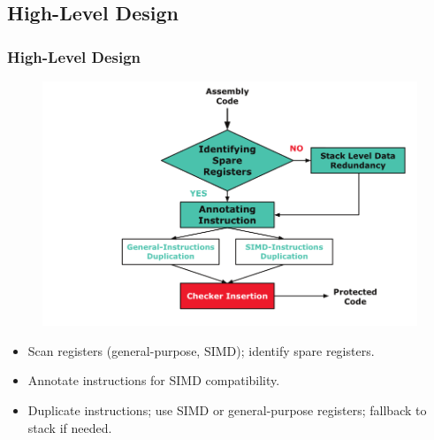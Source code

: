 \documentclass[
	12pt, %
]{beamer}
\begin{document}
\subsection{High-Level Design}
\begin{frame}
	\frametitle{High-Level Design}
	
	\begin{figure}
		\centering
		\includegraphics[width=0.7\linewidth]{Images/img10}
		\label{fig:img10}
	\end{figure}
	
		\begin{itemize}
			\item Scan registers (general-purpose, SIMD); identify spare registers.
			\item Annotate instructions for SIMD compatibility.
			\item Duplicate instructions; use SIMD or general-purpose registers; fallback to stack if needed.
		\end{itemize}
\end{frame}
\end{document}
